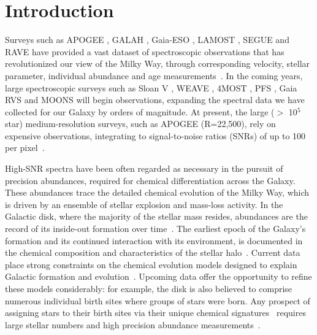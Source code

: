 \documentclass[a4paper,fleqn,usenatbib]{mnras}
\begin{document}

\section{Introduction}
\label{sec:intro}

Surveys such as APOGEE \citep{Majewski2017}, GALAH \citep{deSilva2015}, Gaia-ESO \citep{Gilmore2012}, LAMOST \citep{Newberg2012}, SEGUE \citep{Yanny2009} and RAVE \citep{Steinmetz2006} have provided a vast dataset of spectroscopic observations that has revolutionized our view of the Milky Way, through corresponding velocity, stellar parameter, individual abundance and age measurements~\citep[e.g.][]{Nidever2014,Minchev2014a,Hayden2015,Kord2015,Ho2017,Frankel2018,Bovy2019,Ted2019a,BH2019}. In the coming years, large spectroscopic surveys such as Sloan V \citep{Kollmeier2017}, WEAVE \citep{Bonifacio2016}, 4MOST \citep{deJong2016}, PFS \citep{PFS2016}, Gaia RVS \citep{Gaia2016} and MOONS \citep{C2014} will begin observations, expanding the spectral data we have collected for our Galaxy by orders of magnitude. At present, the large ($>$ 10$^5$ star) medium-resolution surveys, such as APOGEE (R=22,500), rely on expensive observations, integrating to signal-to-noise ratios (SNRs) of up to 100 per pixel~\citep{Zasowski2013,Zasowski2017}. 

High-SNR spectra have been often regarded as necessary in the pursuit of precision abundances, required for  chemical differentiation across the Galaxy.  These abundances trace the detailed chemical evolution of the Milky Way, which is driven by an ensemble of stellar explosion and mass-loss activity. In the Galactic disk, where the majority of the stellar mass resides, abundances are the record of its inside-out formation over time~\citep{Rix2013,BH2016}. The earliest epoch of the Galaxy's formation and its continued interaction with its environment, is documented in the chemical composition and characteristics of the stellar halo~\citep[e.g.][]{Keith2015,Payel2019, Helmi2018}.  Current data place strong constraints on the chemical evolution models designed to explain Galactic formation and evolution~\citep[e.g.][]{Minchev2013,Minchev2014b,Robyn2018, Weinberg2019, Clarke2019, Blancato2019}. Upcoming data offer the opportunity to refine these models considerably: for example, the disk is also believed to comprise  numerous individual birth sites where groups of stars were born. Any prospect of assigning stars to their birth sites via their unique chemical signatures~\citep[e.g.][]{BH2010} requires large stellar numbers and high precision abundance measurements~\citep{Mits2013, Ting2015, Hogg2016, Arm2018}. 
\end{document}
